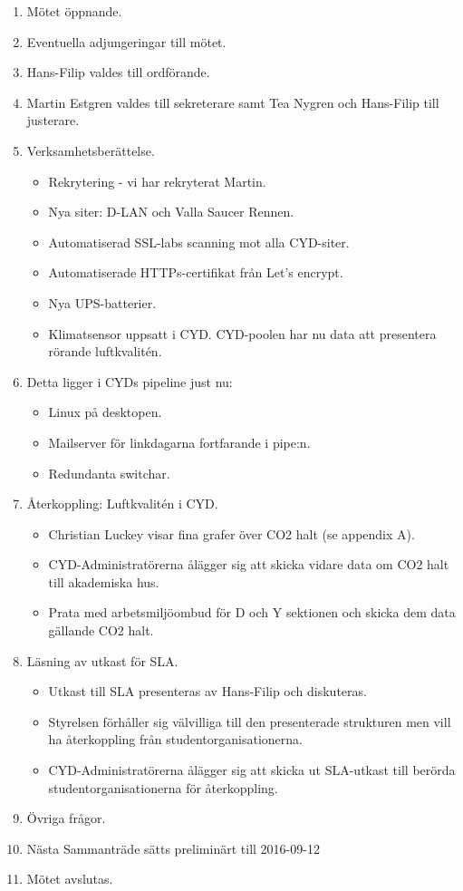 \documentclass[a4paper,12pt]{article}
\begin{document}
\begin{enumerate}
\item Mötet öppnande.
\item Eventuella adjungeringar till mötet.
\item Hans-Filip valdes till ordförande.
\item Martin Estgren valdes till sekreterare samt Tea Nygren och Hans-Filip till justerare.
\item Verksamhetsberättelse.
\begin{itemize}
\item Rekrytering - vi har rekryterat Martin.
\item Nya siter: D-LAN och Valla Saucer Rennen.
\item Automatiserad SSL-labs scanning mot alla CYD-siter.
\item Automatiserade HTTPs-certifikat från Let's encrypt.
\item Nya UPS-batterier.
\item Klimatsensor uppsatt i CYD. CYD-poolen har nu data att presentera rörande luftkvalitén.
\end{itemize}
\newpage
\item Detta ligger i CYDs pipeline just nu:
\begin{itemize}
\item Linux på desktopen.
\item Mailserver för linkdagarna fortfarande i pipe:n.
\item Redundanta switchar.
\end{itemize}
\item Återkoppling: Luftkvalitén i CYD.
\begin{itemize}
\item Christian Luckey visar fina grafer över CO2 halt (se appendix A).
\item CYD-Administratörerna ålägger sig att skicka vidare data om CO2 halt till akademiska hus.
\item Prata med arbetsmiljöombud för D och Y sektionen och skicka dem data gällande CO2 halt.
\end{itemize}
\item Läsning av utkast för SLA.
\begin{itemize}
\item Utkast till SLA presenteras av Hans-Filip och diskuteras. 
\item Styrelsen förhåller sig välvilliga till den presenterade strukturen men vill ha återkoppling från studentorganisationerna. 
\item CYD-Administratörerna ålägger sig att skicka ut SLA-utkast till berörda studentorganisationerna för återkoppling.
\end{itemize}
\item Övriga frågor.
\item Nästa Sammanträde sätts preliminärt till 2016-09-12
\item Mötet avslutas.
\end{enumerate}
\end{document}
